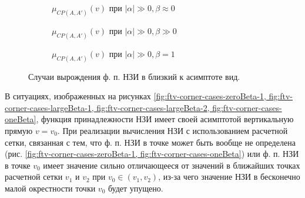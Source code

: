 \begin{figure}[htbp]
	\begin{subfigure}[t]{0.48\textwidth}
		\newcommand{\aOne}{3.34}
		\newcommand{\bOne}{0.02}
		\newcommand{\aTwo}{5}
		\newcommand{\bTwo}{1}
		\centering
		\caption{$\mu_{CP(A, A')}(v)$ при $|\alpha| \gg 0, \beta \approx 0$}
		\label{fig:ftv-corner-cases-zeroBeta-2}
	\end{subfigure}
	\hfill
	\begin{subfigure}[t]{0.48\textwidth}
		\newcommand{\aOne}{3.34}
		\newcommand{\bOne}{1}
		\newcommand{\aTwo}{5}
		\newcommand{\bTwo}{0.02}
		\centering
		\caption{$\mu_{CP(A, A')}(v)$ при $|\alpha| \gg 0, \beta \gg 0$}
		\label{fig:ftv-corner-cases-largeBeta-2}
	\end{subfigure}
	
	\begin{subfigure}[t]{0.48\textwidth}
		\newcommand{\aOne}{1}
		\newcommand{\bOne}{0.1}
		\newcommand{\aTwo}{0.3}
		\newcommand{\bTwo}{0.1}
		\centering
		\caption{$\mu_{CP(A, A')}(v)$ при $|\alpha| \gg 0, \beta = 1$}
		\label{fig:ftv-corner-cases-oneBeta}
	\end{subfigure}
	
	\caption{Случаи вырождения ф. п. НЗИ в близкий к асимптоте вид.}
	\label{fig:ftv-gauss-corner-cases}
\end{figure}

В ситуациях, изображенных на рисунках \cref{fig:ftv-corner-cases-zeroBeta-1, fig:ftv-corner-cases-largeBeta-1, fig:ftv-corner-cases-largeBeta-2, fig:ftv-corner-cases-oneBeta}, функция принадлежности НЗИ имеет своей асимптотой вертикальную прямую $v = v_0$. При реализации вычисления НЗИ с использованием расчетной сетки, связанная с тем, что ф. п. НЗИ в точке может быть вообще не определена (рис. \cref{fig:ftv-corner-cases-zeroBeta-1, fig:ftv-corner-cases-oneBeta}) или ф. п. НЗИ в точке $v_0$ имеет значение сильно отличающееся от значений в ближайших точках расчетной сетки $v_1$ и $v_2$ при $v_0 \in (v_1, v_2)$, из-за чего значение НЗИ в бесконечно малой окрестности точки $v_0$ будет упущено.

